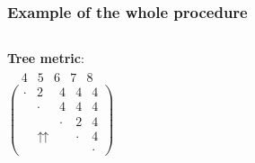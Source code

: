 \addtocounter{framenumber}{-1}
\begin{frame}
\frametitle{Example of the whole procedure}
\begin{columns}[T]%
	\textbf{Tree metric}:\\
	$\begin{array}{ccccc}
	\ \ \; \textit{4} & \textit{5} & \textit{6} & \textit{7} & \textit{8}
	\end{array}$\\
	$
	\left(		
	\begin{array}{ccccc}
	\cdot & 2 & 4 & 4 & 4 \\
	& \cdot & 4 & 4 & 4 \\
	&   & \cdot & 2 & 4 \\
	& \upuparrows & & \cdot & 4\\
	&   &   &   & \cdot
	\end{array}
	\right)
	$ 
\end{columns} 
\end{frame}

